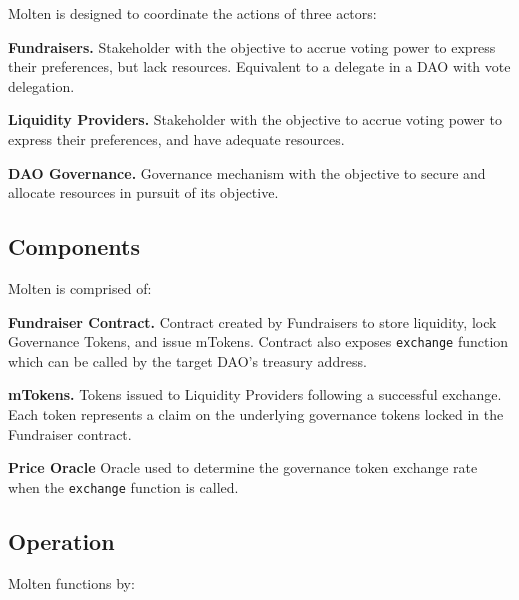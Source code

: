 \documentclass[
]{article}
\begin{document}
Molten is designed to coordinate the actions of three actors:

\textbf{Fundraisers.} Stakeholder with the objective to accrue voting
power to express their preferences, but lack resources. Equivalent to a
delegate in a DAO with vote delegation.

\textbf{Liquidity Providers.} Stakeholder with the objective to accrue
voting power to express their preferences, and have adequate resources.

\textbf{DAO Governance.} Governance mechanism with the objective to
secure and allocate resources in pursuit of its objective.

\hypertarget{components}{%
\subsection{Components}\label{components}}

Molten is comprised of:

\textbf{Fundraiser Contract.} Contract created by Fundraisers to store
liquidity, lock Governance Tokens, and issue mTokens. Contract also
exposes \texttt{exchange} function which can be called by the target
DAO's treasury address.

\textbf{mTokens.} Tokens issued to Liquidity Providers following a
successful exchange. Each token represents a claim on the underlying
governance tokens locked in the Fundraiser contract.

\textbf{Price Oracle} Oracle used to determine the governance token
exchange rate when the \texttt{exchange} function is called.

\hypertarget{operation}{%
\subsection{Operation}\label{operation}}

Molten functions by:
\end{document}
